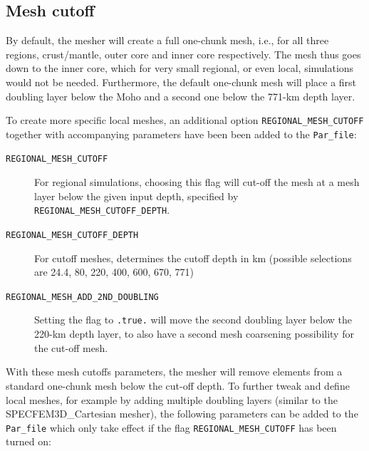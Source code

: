 \subsection{Mesh cutoff}\label{sec:Mesh-cutoff}

By default, the mesher will create a full one-chunk mesh, i.e., for all three regions, crust/mantle, outer core and inner core respectively.
The mesh thus goes down to the inner core, which for very small regional, or even local, simulations would not be needed.
Furthermore, the default one-chunk mesh will place a first doubling layer below the Moho and a second one below the 771-km depth layer.\newline

To create more specific local meshes, an additional option \texttt{REGIONAL\_MESH\_CUTOFF} together with accompanying parameters have been been added to the \texttt{Par\_file}:
\begin{description}
%
\item [{\texttt{REGIONAL\_MESH\_CUTOFF}}] For regional simulations, choosing this flag will cut-off the mesh at a mesh layer
below the given input depth, specified by \texttt{REGIONAL\_MESH\_CUTOFF\_DEPTH}.
%
\item [{\texttt{REGIONAL\_MESH\_CUTOFF\_DEPTH}}] For cutoff meshes, determines the cutoff depth in km (possible selections are 24.4, 80, 220, 400, 600, 670, 771)
%
\item [{\texttt{REGIONAL\_MESH\_ADD\_2ND\_DOUBLING}}] Setting the flag to \texttt{.true.} will move the second doubling layer below the
220-km depth layer, to also have a second mesh coarsening possibility for the cut-off mesh.
%
\end{description}

With these mesh cutoffs parameters, the mesher will remove elements from a standard one-chunk mesh below the cut-off depth. To further tweak and define local meshes, for example by adding multiple doubling layers (similar to the SPECFEM3D\_Cartesian mesher), the following parameters can be added to the \texttt{Par\_file} which only take effect if the flag \texttt{REGIONAL\_MESH\_CUTOFF} has been turned on:

